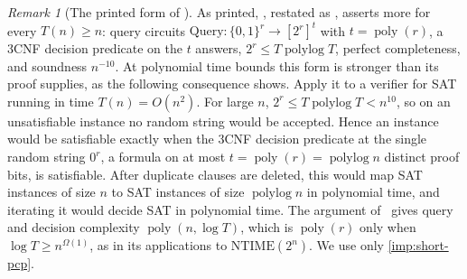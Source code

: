 \documentclass[11pt,letterpaper]{article}
\theoremstyle{definition}
\theoremstyle{remark}
\newtheorem{remark}[theorem]{Remark}
\newcommand{\NTIME}{\mathrm{NTIME}}
\newcommand{\poly}{\operatorname{poly}}
\newcommand{\polylog}{\operatorname{polylog}}
\begin{document}
\begin{remark}[The printed form of {\cite[Theorem~1.1]{BV14}}]
\label{rem:bv14-printed}
As printed, \cite[Theorem~1.1]{BV14}, restated as
\cite[Lemma~3.10]{CLW20}, asserts more for every \(T(n)\ge n\): query
circuits \(\mathrm{Query}:\{0,1\}^r\to[2^r]^t\) with
\(t=\poly(r)\), a 3CNF decision predicate on the \(t\) answers,
\(2^r\le T\polylog T\), perfect completeness, and soundness
\(n^{-10}\). At polynomial time bounds this form is stronger than its
proof supplies, as the following consequence shows. Apply it to a
verifier for SAT running in time \(T(n)=O(n^2)\). For large \(n\),
\(2^r\le T\polylog T<n^{10}\), so on an unsatisfiable instance no random
string would be accepted. Hence an instance would be satisfiable exactly
when the 3CNF decision predicate at the single random string \(0^r\), a
formula on at most \(t=\poly(r)=\polylog n\) distinct proof bits, is
satisfiable. After duplicate clauses are deleted, this would map SAT
instances of size \(n\) to SAT instances of size \(\polylog n\) in
polynomial time, and iterating it would decide SAT in polynomial
time. The argument of~\cite[Section~4.4]{BV14} gives query
and decision complexity \(\poly(n,\log T)\), which is \(\poly(r)\) only
when \(\log T\ge n^{\Omega(1)}\), as in its applications to
\(\NTIME(2^n)\). We use only \cref{imp:short-pcp}.
\end{remark}
\end{document}
